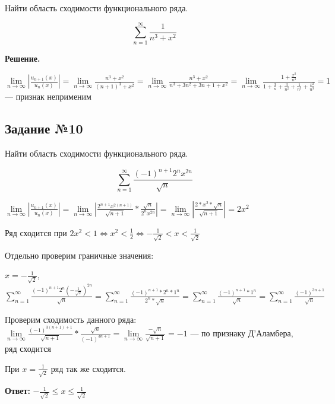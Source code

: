 \documentclass{article}
\begin{document}
Найти область сходимости функционального ряда.

$$
\sum\limits_{n = 1}^{\infty} \frac{1}{n^3 + x^2}
$$

\textbf{Решение.}

$\lim\limits_{n \to \infty} | \frac{u_{n + 1} (x)}{u_{n} (x)} | = \lim\limits_{n \to \infty} \frac{n^3 + x^2}{(n + 1)^3 + x^2} = \lim\limits_{n \to \infty} \frac{n^3 + x^2}{n^3 + 3n^2 + 3n + 1 + x^2} = \lim\limits_{n \to \infty} \frac{1 + \frac{x^2}{n^3}}{1 + \frac{3}{n} + \frac{3}{n^2} + \frac{1}{n^3} + \frac{x^2}{n^3}} = 1$ — признак неприменим

\subsection{Задание №10}

Найти область сходимости функционального ряда.

$$
\sum\limits_{n = 1}^{\infty} \frac{(-1)^{n + 1} 2^{n} x^{2 n}}{\sqrt{n}}
$$

$\lim\limits_{n \to \infty} | \frac{u_{n + 1} (x)}{u_{n} (x)} | = \lim\limits_{n \to \infty} | \frac{2^{n + 1} x^{2 (n + 1)}}{\sqrt{n + 1}} * \frac{\sqrt{n}}{2^{n} x^{2 n}} | = \lim\limits_{n \to \infty} | \frac{2 * x^{2} * \sqrt{n}}{\sqrt{n + 1}} | = 2x^2
$

Ряд сходится при $2x^2 < 1 \Longleftrightarrow x^2 < \frac{1}{2} \Longleftrightarrow -\frac{1}{\sqrt{2}} < x < \frac{1}{\sqrt{2}}$

\hfill

Отдельно проверим граничные значения:

$x = - \frac{1}{\sqrt{2}}$, $\sum\limits_{n = 1}^{\infty} \frac{(-1)^{n + 1} 2^{n} (-\frac{1}{\sqrt{2}})^{2 n}}{\sqrt{n}} = \sum\limits_{n = 1}^{\infty} \frac{(-1)^{n + 1} * 2^{n} * 1^{n}}{2^{n} * \sqrt{n}} = \sum\limits_{n = 1}^{\infty} \frac{(-1)^{n + 1} * 1^{n}}{\sqrt{n}} = \sum\limits_{n = 1}^{\infty} \frac{(-1)^{3 n + 1}}{\sqrt{n}}$

Проверим сходимость данного ряда: $\lim\limits_{n \to \infty} \frac{(-1)^{3 (n + 1) + 1}}{\sqrt{n + 1}} * \frac{\sqrt{n}}{(-1)^{3 n + 1}} = \lim\limits_{n \to \infty} \frac{- \sqrt{n}}{\sqrt{n + 1}} = -1$ — по признаку Д'Аламбера, ряд сходится

При $x = \frac{1}{\sqrt{2}}$ ряд так же сходится.

\hfill

\textbf{Ответ:} $-\frac{1}{\sqrt{2}} \le x \le \frac{1}{\sqrt{2}}$
\end{document}
